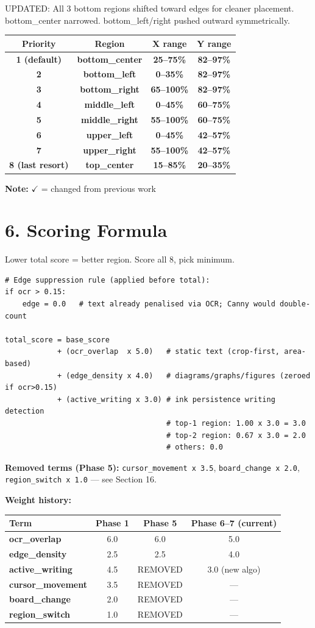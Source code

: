 \documentclass[11pt]{article}
\begin{document}
UPDATED: All 3 bottom regions shifted toward edges for cleaner placement. bottom\_center narrowed. bottom\_left/right pushed outward symmetrically.

\begin{tabularx}{\textwidth}{>{\bfseries}c >{\bfseries}c >{\bfseries}c >{\bfseries}c}
Priority & Region & X range & Y range \\
\midrule
1 (default) & bottom\_center & 25--75\% & 82--97\% \\
2 & bottom\_left & 0--35\% & 82--97\% \\
3 & bottom\_right & 65--100\% & 82--97\% \\
4 & middle\_left & 0--45\% & 60--75\% \\
5 & middle\_right & 55--100\% & 60--75\% \\
6 & upper\_left & 0--45\% & 42--57\% \\
7 & upper\_right & 55--100\% & 42--57\% \\
8 (last resort) & top\_center & 15--85\% & 20--35\% \\
\end{tabularx}

\noindent \textbf{Note:} \(\checkmark\) = changed from previous work

\section*{6. Scoring Formula}
Lower total score = better region. Score all 8, pick minimum.

\begin{verbatim}
# Edge suppression rule (applied before total):
if ocr > 0.15:
    edge = 0.0   # text already penalised via OCR; Canny would double-count

total_score = base_score
            + (ocr_overlap  x 5.0)   # static text (crop-first, area-based)
            + (edge_density x 4.0)   # diagrams/graphs/figures (zeroed if ocr>0.15)
            + (active_writing x 3.0) # ink persistence writing detection
                                     # top-1 region: 1.00 x 3.0 = 3.0
                                     # top-2 region: 0.67 x 3.0 = 2.0
                                     # others: 0.0
\end{verbatim}

\textbf{Removed terms (Phase 5):} \texttt{cursor\_movement x 3.5}, \texttt{board\_change x 2.0}, \texttt{region\_switch x 1.0} --- see Section 16.

\textbf{Weight history:}
\begin{tabularx}{\textwidth}{>{\bfseries}l c c c}
Term & Phase 1 & Phase 5 & Phase 6--7 (current) \\
\midrule
ocr\_overlap  & 6.0 & 6.0 & 5.0 \\
edge\_density & 2.5 & 2.5 & 4.0 \\
active\_writing & 4.5 & REMOVED & 3.0 (new algo) \\
cursor\_movement & 3.5 & REMOVED & --- \\
board\_change & 2.0 & REMOVED & --- \\
region\_switch & 1.0 & REMOVED & --- \\
\end{tabularx}
\end{document}
